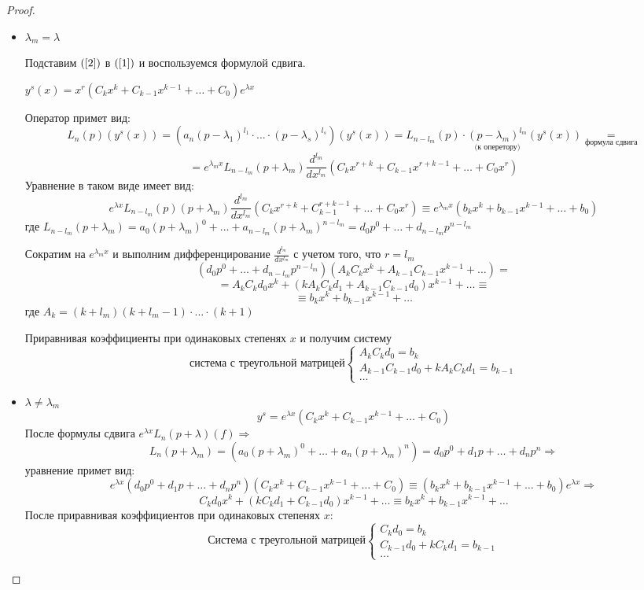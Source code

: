 \begin{proof}
\begin{itemize}
    \item $\lambda_m=\lambda$ \par
    Подставим $(\ref{2})$  в $(\ref{1})$ и воспользуемся формулой сдвига.\par
    $y^s(x)=x^r(C_kx^k+C_{k-1}x^{k-1}+\dots + C_0)e^{\lambda x}$\par
    Оператор примет вид:
    $$L_n(p)(y^s(x))=(a_n(p-\lambda_1)^{l_1}\cdot...\cdot (p-\lambda_s)^{l_s})(y^s(x))=
    L_{n-l_m}(p)\cdot \underset{\text{(к оперетору)}}{(p-\lambda_m)^{l_m}}(y^s(x))\underset{\text{формула сдвига}}{=}
    $$$$=e^{\lambda_m x}L_{n-l_m}(p+\lambda_m)\frac{d^{l_m}}{dx^{l_m}}(C_kx^{r+k}+C_{k-1}x^{r+k-1}+\dots+C_0x^r)$$
    Уравнение в таком виде имеет вид:
    $$e^{\lambda x}L_{n-l_m}(p)(p+\lambda_m)\frac{d^{l_m}}{dx^{l_m}}(C_kx^{r+k}+C_{k-1}^{r+k-1}+\dots+C_0x^r)\equiv e^{\lambda_m x}(b_kx^k+b_{k-1}x^{k-1}+\dots+b_0)$$
    где $L_{n-l_m}(p+\lambda_m)=a_0(p+\lambda_m)^0+\dots+ a_{n-l_m}(p+\lambda_m)^{n-l_m}=d_0p^0+\dots+ d_{n-l_m}p^{n-l_m}$\par
    Сократим на $e^{\lambda_m x}$ и выполним дифференцирование $\frac{d^{l_m}}{dx^{l_m}}$ с учетом того, что $r=l_m$
    $$(d_0p^0+\dots + d_{n-l_m}p^{n-l_m})(A_kC_kx^k+A_{k-1}C_{k-1}x^{k-1}+\dots)=$$
    $$=A_kC_kd_0x^k+(kA_kC_kd_1+A_{k-1}C_{k-1}d_0)x^{k-1}+\dots \equiv$$$$\equiv b_kx^k+b_{k-1}x^{k-1}+\dots$$ где $A_k=(k+l_m)(k+l_m-1)\cdot ... \cdot (k+1)$\par
    Приравнивая коэффициенты при одинаковых степенях $x$ и получим систему 
    \begin{equation}
       \text{система с треугольной матрицей}
        \begin{cases}
            A_kC_kd_0=b_k\\
            A_{k-1}C_{k-1}d_0+kA_kC_kd_1=b_{k-1}\\
            \dots
        \end{cases}
    \end{equation}
    \item $\lambda\neq \lambda_m$
    $$y^s=e^{\lambda x}(C_kx^k+C_{k-1}x^{k-1}+\dots+ C_0)$$
    После формулы сдвига $e^{\lambda x}L_n(p+\lambda)(f)\Rightarrow$
    $$L_n(p+\lambda_m)=(a_0(p+\lambda_m)^0+\dots+a_n(p+\lambda_m)^n)=d_0p^0+d_1p+\dots+d_np^n\Rightarrow$$
    уравнение примет вид:
    $$e^{\lambda x}(d_0p^0+d_1p+\dots+d_np^n)(C_kx^k+C_{k-1}x^{k-1}+\dots+C_0)\equiv (b_kx^k+b_{k-1}x^{k-1}+\dots +b_0)e^{\lambda x}\Rightarrow$$
    $$C_kd_0x^k+(kC_kd_1+C_{k-1}d_0)x^{k-1}+\dots\equiv b_kx^k+b_{k-1}x^{k-1}+\dots$$
    После приравнивая коэффициентов при одинаковых степенях $x$:
    \begin{equation}
    \text{Система с треугольной матрицей}
        \begin{cases}
            C_kd_0=b_k\\
            C_{k-1}d_0+kC_kd_1=b_{k-1}\\
            \dots
        \end{cases}
    \end{equation}
\end{itemize}
\end{proof}
